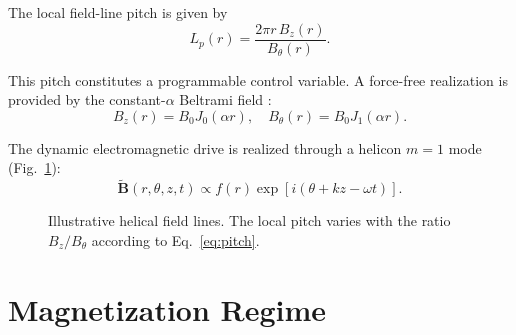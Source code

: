 \documentclass[11pt]{article}
\begin{document}
The local field-line pitch is given by
\begin{equation}
L_p(r) = \frac{2\pi r\, B_z(r)}{B_\theta(r)}.
\label{eq:pitch}
\end{equation}

This pitch constitutes a programmable control variable. A force-free realization is provided by the constant-$\alpha$ Beltrami field \cite{freidberg}:
\begin{equation}
B_z(r) = B_0 J_0(\alpha r), \quad B_\theta(r) = B_0 J_1(\alpha r).
\label{eq:forcefree}
\end{equation}

The dynamic electromagnetic drive is realized through a helicon $m=1$ mode (Fig.~\ref{fig:fieldlines}):
\begin{equation}
\tilde{\mathbf{B}}(r,\theta,z,t) \propto f(r)\exp[i(\theta + kz - \omega t)].
\label{eq:helicon}
\end{equation}

\begin{figure}[htbp]
\centering
{}
\caption{Illustrative helical field lines. The local pitch varies with the ratio $B_z/B_\theta$ according to Eq.~\eqref{eq:pitch}.}
\label{fig:fieldlines}
\end{figure}

\section{Magnetization Regime}
\label{sec:magnetization}
\end{document}
